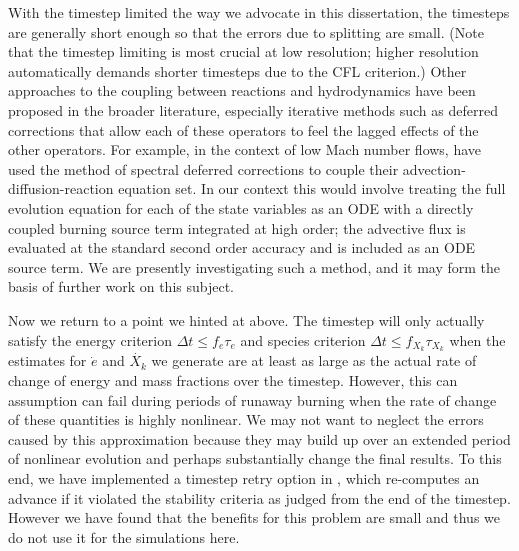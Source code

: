 \documentclass[12pt]{article}
\begin{document}
With the timestep limited the way we advocate in this dissertation, 
the timesteps are generally short enough so that the errors 
due to splitting are small. (Note that the timestep limiting is
most crucial at low resolution; higher resolution automatically demands
shorter timesteps due to the CFL criterion.) Other approaches to the coupling 
between reactions and hydrodynamics have been proposed in the 
broader literature, especially iterative methods such as 
deferred corrections that allow each of these operators to 
feel the lagged effects of the other operators. For example,
in the context of low Mach number flows, \cite{nonaka:2012} have
used the method of spectral deferred corrections \citep{SDC} to
couple their advection-diffusion-reaction equation set. In our
context this would involve treating the full evolution equation
for each of the state variables as an ODE with a directly coupled
burning source term integrated at high order; the advective
flux is evaluated at the standard second order accuracy
and is included as an ODE source term.
We are presently investigating such a method,
and it may form the basis of further work on this subject.

Now we return to a point we hinted at above. The timestep
will only actually satisfy the energy criterion
$\Delta t \leq f_e \tau_e$ and species criterion
$\Delta t \leq f_{X_k} \tau_{X_k}$ when the estimates for
$\dot{e}$ and $\dot{X_k}$ we generate are at least as large
as the actual rate of change of energy and mass fractions
over the timestep. However, this can assumption can fail
during periods of runaway burning when the rate of change
of these quantities is highly nonlinear. We may not want
to neglect the errors caused by this approximation
because they may build up over an extended period of nonlinear
evolution and perhaps substantially change the final results.
To this end, we have implemented a timestep retry option in
\castro, which re-computes an advance if it violated the
stability criteria as judged from the end of the timestep.
However we have found that the benefits for this problem are
small and thus we do not use it for the simulations here.
\end{document}
